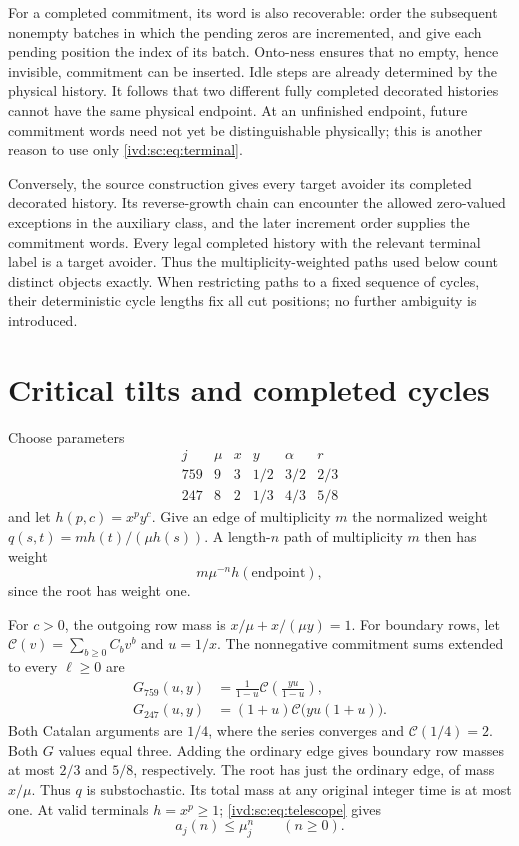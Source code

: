 \documentclass[11pt,letterpaper]{article}
\theoremstyle{remark}\newtheorem{remark}[theorem]{Remark}
\numberwithin{equation}{section}
\begin{document}
For a completed commitment, its word is also recoverable: order the
subsequent nonempty batches in which the pending zeros are incremented,
and give each pending position the index of its batch. Onto-ness ensures
that no empty, hence invisible, commitment can be inserted. Idle steps
are already determined by the physical history. It follows that two
different fully completed decorated histories cannot have the same
physical endpoint. At an unfinished endpoint, future commitment words
need not yet be distinguishable physically; this is another reason to
use only \eqref{ivd:sc:eq:terminal}.

Conversely, the source construction gives every target avoider its
completed decorated history. Its reverse-growth chain can encounter the
allowed zero-valued exceptions in the auxiliary class, and the later
increment order supplies the commitment words. Every legal completed
history with the relevant terminal label is a target avoider. Thus the
multiplicity-weighted paths used below count distinct objects exactly.
When restricting paths to a fixed sequence of cycles, their deterministic
cycle lengths fix all cut positions; no further ambiguity is introduced.

\section{Critical tilts and completed cycles}\label{ivd:sc:sec:tilts}
Choose parameters
\begin{equation}\label{ivd:sc:eq:parameters}
\begin{array}{c|ccccc}
 j&\mu&x&y&\alpha&r\\ \hline
 759&9&3&1/2&3/2&2/3\\
 247&8&2&1/3&4/3&5/8
\end{array}
\end{equation}
and let $h(p,c)=x^p y^c$. Give an edge of multiplicity $m$ the normalized
weight $q(s,t)=m h(t)/(\mu h(s))$. A length-$n$ path of multiplicity $m$
then has weight
\begin{equation}\label{ivd:sc:eq:telescope}
 m\mu^{-n}h(\mathrm{endpoint}),
\end{equation}
since the root has weight one.

For $c>0$, the outgoing row mass is $x/\mu+x/(\mu y)=1$.
For boundary rows, let $\mathcal C(v)=\sum_{b\ge0}C_bv^b$ and $u=1/x$.
The nonnegative commitment sums extended to every $\ell\ge0$ are
\begin{align}
 G_{759}(u,y)&=\frac1{1-u}\mathcal C\!\left(\frac{yu}{1-u}\right),\\
 G_{247}(u,y)&=(1+u)\mathcal C\big(yu(1+u)\big).
\end{align}
Both Catalan arguments are $1/4$, where the series converges and
$\mathcal C(1/4)=2$. Both $G$ values equal three. Adding the ordinary
edge gives boundary row masses at most $2/3$ and $5/8$, respectively.
The root has just the ordinary edge, of mass $x/\mu$. Thus $q$ is
substochastic. Its total mass at any original integer time is at most
one. At valid terminals $h=x^p\ge1$; \eqref{ivd:sc:eq:telescope} gives
\begin{equation}\label{ivd:sc:eq:crudeupper}
 a_j(n)\le\mu_j^n\qquad(n\ge0).
\end{equation}
\end{document}
